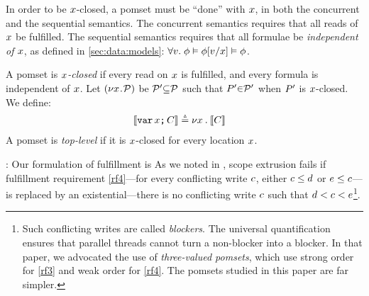 
In order to be $\aLoc$-closed, a pomset must be ``done'' with $\aLoc$, in
both the concurrent and the sequential semantics.  The concurrent semantics
requires that all reads of $\aLoc$ be fulfilled.  The sequential semantics
requires that all formulae be \emph{independent of $\aLoc$}, as defined
in \textsection\ref{sec:data:models}:
$\forall\aVal.\;\aForm \vDash \aForm[\aVal/\aLoc] \vDash \aForm$.


\begin{definition}
  A pomset is \emph{$\aLoc$-closed} if every \external read on $\aLoc$ is fulfilled,
  and every formula is independent of $\aLoc$.
  Let $(\nu\aLoc\!\DOT\!\aPSS)$ be  $\aPSS'{\subseteq}\aPSS$ such that $\aPS'{\in}\aPSS'$
  when $\aPS'$ is $\aLoc$-closed.
  We define:
\begin{align*}
  \sem[\aThrd]{\VAR\aLoc\SEMI \aCmd} & \eqdef
  \nu \aLoc \DOT \sem[\aThrd]{\aCmd}  
\end{align*}
  A pomset is \emph{top-level} if it is $\aLoc$-closed for every location
  $\aLoc$.  
\end{definition}

:
Our formulation of fulfillment is 
As we noted in \cite[\textsection B]{2019-sp}, scope extrusion fails if
fulfillment requirement \ref{rf4}---for every conflicting write $\cEv$,
either $\cEv \gtN \bEv$ or $\aEv \gtN \cEv$---is replaced by an
existential---there is no conflicting write $\cEv$ such that
$\bEv<\cEv<\aEv$\footnote{Such conflicting writes are called \emph{blockers}.
  The universal quantification ensures that parallel threads cannot turn a
  non-blocker into a blocker.  In that paper, we advocated the use of
  \emph{three-valued pomsets}, which use strong order for \ref{rf3} and weak
  order for \ref{rf4}.  The pomsets studied in this paper are far simpler.}.




